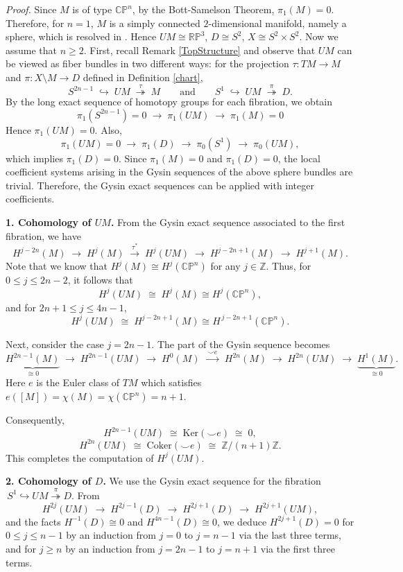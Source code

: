 \documentclass[a4paper, 12pt]{article}
\newcommand{\oX}{X}
\newcommand{\bZ}{\mathbb{Z}}
\newcommand{\bCP}{\mathbb{CP}^n}
\begin{document}
\noindent \textit{Proof.}
Since $M$ is of type $\bCP$, by the Bott-Samelson Theorem, $\pi_1(M)=0$. Therefore, for $n=1$, $M$ is a simply connected $2$-dimensional manifold, namely a sphere, which is resolved in \cite{BL18}. Hence $UM\cong\mathbb{RP}^3$, $D\cong S^2$, $\oX\cong S^2\times S^2$. Now we assume that $n\geq 2$.
First, recall Remark \ref{TopStructure} and observe that $UM$ can be viewed as fiber bundles in two different ways: for the projection $\tau:TM\to M$ and $\pi:X\setminus M \to D$ defined in Definition \ref{chart},
\[
S^{2n-1} \;\hookrightarrow\; UM \;\overset{\tau}{\twoheadrightarrow}\; M
\quad\quad\text{and}\quad\quad
S^1 \;\hookrightarrow\; UM \;\overset{\pi}{\twoheadrightarrow}\; D.
\]
By the long exact sequence of homotopy groups for each fibration, we obtain
\[
\pi_1(S^{2n-1})=0 \;\longrightarrow\; \pi_1(UM) \;\longrightarrow\; \pi_1(M)=0
\]
Hence $\pi_1(UM)=0.$ Also,
\[
\pi_1(UM)=0\;\longrightarrow\;\pi_1(D)\;\longrightarrow\;\pi_0(S^1)\;\longrightarrow\; \pi_0(UM),
\]
which implies $\pi_1(D)=0.$ Since $\pi_1(M)=0$ and $\pi_1(D)=0$, the local coefficient systems arising in the Gysin sequences of the above sphere bundles are trivial. Therefore, the Gysin exact sequences can be applied with integer coefficients.

\noindent\textbf{1. Cohomology of $UM$.} From the Gysin exact sequence associated to the first fibration, we have
\[
H^{j-2n}(M)\;\longrightarrow\;H^j(M)\;\stackrel{\tau^*}{\longrightarrow}\;H^j(UM)\;\longrightarrow\;H^{j-2n+1}(M)\;\longrightarrow\;H^{j+1}(M).
\]
Note that we know that $H^j(M)\cong H^j(\bCP)$ for any $j\in \bZ$. 
Thus, for \(0 \leq j \leq 2n-2\), it follows that 
\[
H^j(UM)\;\cong\; H^j(M)\cong H^j(\bCP),
\]
and for \(2n+1 \leq j \leq 4n-1\),
\[
H^j(UM)\;\cong\; H^{j-2n+1}(M)\cong H^{\,j-2n+1}(\bCP).
\]

Next, consider the case \(j=2n-1\). The part of the Gysin sequence becomes
\[
\underbrace{H^{2n-1}(M)}_{\cong 0}
\;\longrightarrow\;
H^{2n-1}(UM)
\;\longrightarrow\;
H^0(M)\;\xrightarrow{\;\smile e\;}\;H^{2n}(M)
\;\longrightarrow\;
H^{2n}(UM)\;\longrightarrow\;
\underbrace{H^1(M)}_{\cong 0}.
\]
Here $e$ is the Euler class of $TM$ which satisfies $e([M])=\chi(M)=\chi(\bCP)=n+1$.

Consequently,
\[
H^{2n-1}(UM)\;\cong\;\mathrm{Ker}(\smile e)\;\cong\;0,
\]
\[
H^{2n}(UM)\;\cong\;\mathrm{Coker}(\smile e)\;\cong\;\bZ/(n+1)\bZ.
\]
This completes the computation of \(H^j(UM)\).

\noindent\textbf{2. Cohomology of $D$.} We use the Gysin exact sequence for the fibration 
\(\,S^1\hookrightarrow UM \overset{\pi}{\twoheadrightarrow} D.\)
From
\[
H^{2j}(UM)\;\longrightarrow\;H^{2j-1}(D)\;\longrightarrow\;H^{2j+1}(D)\;\longrightarrow\;H^{2j+1}(UM),
\]
and the facts \(H^{-1}(D)\cong 0\) and \(H^{4n-1}(D)\cong 0\), we deduce \(H^{2j+1}(D)=0\) for \(0 \leq j \leq n-1\) by an induction from \(j=0\) to \(j=n-1\) via the last three terms, and for \(j \geq n\) by an induction from \(j=2n-1\) to \(j=n+1\) via the first three terms.
\end{document}
